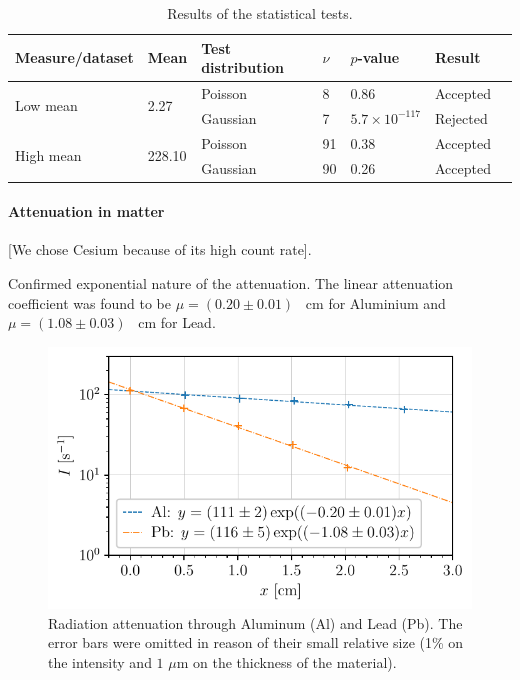\begin{table}[htbp]
    \centering
    \begin{tabular}{lllllll}
        \hline
        Measure/dataset & Mean & Test distribution & $\nu$ & $p$-value & Result \\
        \hline
        \multirow{2}{*}{Low mean} & \multirow{2}{*}{2.27} & Poisson & 8 & 0.86 & Accepted\\
        & & Gaussian & 7 & $5.7 \times 10^{-117}$ & Rejected \\
        \multirow{2}{*}{High mean} & \multirow{2}{*}{228.10} & Poisson & 91 & 0.38 & Accepted\\
        & & Gaussian & 90 & 0.26 & Accepted\\
        \hline
    \end{tabular}
    \caption{Results of the statistical tests.}
    \label{tab:statistical_tests}
\end{table}

\paragraph{Attenuation in matter}
[We chose Cesium because of its high count rate].

Confirmed exponential nature of the attenuation.
The linear attenuation coefficient was found to be $\mu = (0.20 \pm 0.01)$ \unit{\per\cm} for Aluminium
and $\mu = (1.08 \pm 0.03)$ \unit{\per\cm} for Lead.
\begin{figure}[htbp]
    \centering
    \includegraphics[scale=1]{figures/attenuation_coefficient.pdf}
    \caption{Radiation attenuation through Aluminum (Al) and Lead (Pb). 
             The error bars were omitted in reason of their small relative size 
             (1\% on the intensity and $1$ $\mu$m on the thickness of the material).}
    \label{fig:attenuation_coefficient}
\end{figure}

